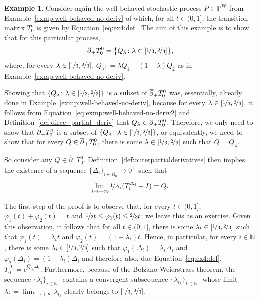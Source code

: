 \documentclass[10pt,a4paper]{paper}
\theoremstyle{definition}
\newtheorem{exmp}{Example}%
\newcommand{\nats}{\mathbb{N}}
\newcommand{\processes}{\mathbb{P}}
\newcommand{\wprocesses}{\processes^{\mathrm{W}}}
\newcommand{\coloneqq}{:\!=}
\begin{document}
\begin{exmp}\label{exmp:outerderivative}
Consider again the well-behaved stochastic process $P\in\wprocesses$ from Example~\ref{exmp:well-behaved-no-deriv} of which, for all $t\in(0,1]$, the transition matrix $T_0^t$ is given by Equation~\eqref{eq:ex4:def}. 
The aim of this example is to show that for this particular process,
\begin{equation*}
\smash{\overline{\partial}}_+T_0^0=\big\{Q_\lambda\colon \lambda\in[\nicefrac{1}{3},\nicefrac{2}{3}]\big\},
\end{equation*}
where, for every $\lambda\in[\nicefrac{1}{3},\nicefrac{2}{3}]$, $Q_\lambda\coloneqq\lambda Q_1+(1-\lambda)Q_2$ as in Example~\ref{exmp:well-behaved-no-deriv}.

Showing that $\{Q_\lambda\colon \lambda\in[\nicefrac{1}{3},\nicefrac{2}{3}]\}$ is a subset of $\smash{\overline{\partial}}_+T_0^0$ was, essentially, already done in Example~\ref{exmp:well-behaved-no-deriv}, because for every $\lambda\in[\nicefrac{1}{3},\nicefrac{2}{3}]$, it follows from Equation~\eqref{eq:exmp:well-behaved-no-deriv2} and Definition~\ref{def:direc_partial_deriv} that $Q_\lambda\in\smash{\overline{\partial}}_+T_0^0$. Therefore, we only need to show that $\smash{\overline{\partial}}_+T_0^0$ is a subset of $\{Q_\lambda\colon \lambda\in[\nicefrac{1}{3},\nicefrac{2}{3}]\}$, or equivalently, we need to show that for every $Q\in\smash{\overline{\partial}}_+T_0^0$, there is some $\lambda\in[\nicefrac{1}{3},\nicefrac{2}{3}]$ such that $Q=Q_\lambda$.

So consider any $Q\in\overline{\partial}_+T_0^0$. Definition~\ref{def:outerpartialderivatives} then implies the existence of a sequence $\{\Delta_i\}_{i\in\nats_0}\to 0^+$ such that 
\begin{equation}\label{eq:exmp:outerderivative}
\lim_{i\to+\infty}\nicefrac{1}{\Delta_i}(T_0^{\Delta_i}-I)=Q.
\end{equation}

The first step of the proof is to observe that, for every $t\in(0,1]$, $\varphi_1(t)+\varphi_2(t)=t$ and $\nicefrac{1}{3}t\leq\varphi_1(t)\leq\nicefrac{2}{3}t$; we leave this as an exercise. Given this observation, it follows that for all $t\in(0,1]$, there is some $\lambda_t\in[\nicefrac{1}{3},\nicefrac{2}{3}]$ such that $\varphi_1(t)=\lambda_t t$ and $\varphi_2(t)=(1-\lambda_t)t$. Hence, in particular, for every $i\in\nats$, there is some $\lambda_i\in[\nicefrac{1}{3},\nicefrac{2}{3}]$ such that $\varphi_1(\Delta_i)=\lambda_i \Delta_i$ and $\varphi_2(\Delta_i)=(1-\lambda_i)\Delta_i$ and therefore also, due Equation~\eqref{eq:ex4:def}, $T_0^{\Delta_i}=e^{Q_{\lambda_i}\Delta_i}$.
Furthermore, because of the Bolzano-Weierstrass theorem, the sequence $\{\lambda_i\}_{i\in\nats_0}$ contains a convergent subsequence $\{\lambda_{i_k}\}_{k\in\nats_0}$ whose limit $\lambda\coloneqq\lim_{k\to+\infty}\lambda_{i_k}$ clearly belongs to $[\nicefrac{1}{3},\nicefrac{2}{3}]$. 


\end{exmp}
\end{document}
